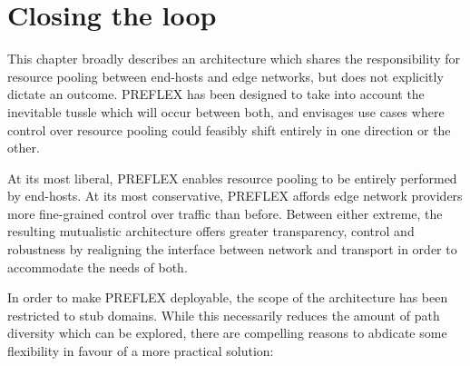 \section{Closing the loop}

This chapter broadly describes an architecture which shares the responsibility for resource pooling between end-hosts and edge networks, but does not explicitly dictate an outcome. \ac{PREFLEX} has been designed to take into account the inevitable tussle which will occur between both, and envisages use cases where control over resource pooling could feasibly shift entirely in one direction or the other. 

At its most liberal, \ac{PREFLEX} enables resource pooling to be entirely performed by end-hosts. At its most conservative, \ac{PREFLEX} affords edge network providers more fine-grained control over traffic than before. Between either extreme, the resulting mutualistic architecture offers greater transparency, control and robustness by realigning the interface between network and transport in order to accommodate the needs of both.

In order to make \ac{PREFLEX} deployable, the scope of the architecture has been restricted to stub domains.
While this necessarily reduces the amount of path diversity which can be explored, there are compelling reasons to abdicate some flexibility in favour of a more practical solution:


